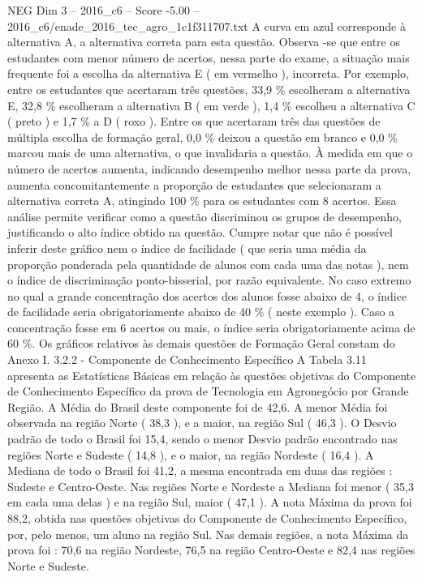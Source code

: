 \begin{textsample}{NEG Dim 3 – 2016\_c6 – Score -5.00 – 2016\_c6/enade\_2016\_tec\_agro\_1c1f311707.txt}
A curva em azul corresponde à alternativa A, a alternativa correta para esta questão.
Observa -se que entre os estudantes com menor número de acertos, nessa parte do exame, a situação mais frequente foi a escolha da alternativa E ( em vermelho ), incorreta.
Por exemplo, entre os estudantes que acertaram três questões, 33,9 \% escolheram a alternativa E, 32,8 \% escolheram a alternativa B ( em verde ), 1,4 \% escolheu a alternativa C ( preto ) e 1,7 \% a D ( roxo ).
Entre os que acertaram três das questões de múltipla escolha de formação geral, 0,0 \% deixou a questão em branco e 0,0 \% marcou mais de uma alternativa, o que invalidaria a questão.
À medida em que o número de acertos aumenta, indicando desempenho melhor nessa parte da prova, aumenta concomitantemente a proporção de estudantes que selecionaram a alternativa correta A, atingindo 100 \% para os estudantes com 8 acertos.
Essa análise permite verificar como a questão discriminou os grupos de desempenho, justificando o alto índice obtido na questão.
Cumpre notar que não é possível inferir deste gráfico nem o índice de facilidade ( que seria uma média da proporção ponderada pela quantidade de alunos com cada uma das notas ), nem o índice de discriminação ponto-bisserial, por razão equivalente.
No caso extremo no qual a grande concentração dos acertos dos alunos fosse abaixo de 4, o índice de facilidade seria obrigatoriamente abaixo de 40 \% ( neste exemplo ).
Caso a concentração fosse em 6 acertos ou mais, o índice seria obrigatoriamente acima de 60 \%.
Os gráficos relativos às demais questões de Formação Geral constam do Anexo I. 3.2.2 - Componente de Conhecimento Específico A Tabela 3.11 apresenta as Estatísticas Básicas em relação às questões objetivas do Componente de Conhecimento Específico da prova de Tecnologia em Agronegócio por Grande Região.
A Média do Brasil deste componente foi de 42,6.
A menor Média foi observada na região Norte ( 38,3 ), e a maior, na região Sul ( 46,3 ).
O Desvio padrão de todo o Brasil foi 15,4, sendo o menor Desvio padrão encontrado nas regiões Norte e Sudeste ( 14,8 ), e o maior, na região Nordeste ( 16,4 ).
A Mediana de todo o Brasil foi 41,2, a mesma encontrada em duas das regiões : Sudeste e Centro-Oeste.
Nas regiões Norte e Nordeste a Mediana foi menor ( 35,3 em cada uma delas ) e na região Sul, maior ( 47,1 ).
A nota Máxima da prova foi 88,2, obtida nas questões objetivas do Componente de Conhecimento Específico, por, pelo menos, um aluno na região Sul.
Nas demais regiões, a nota Máxima da prova foi : 70,6 na região Nordeste, 76,5 na região Centro-Oeste e 82,4 nas regiões Norte e Sudeste.

\end{textsample}

